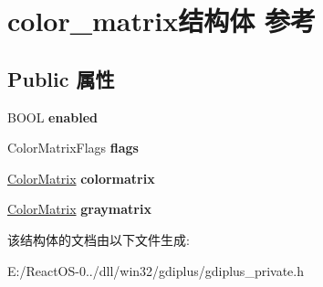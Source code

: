 \hypertarget{structcolor__matrix}{}\section{color\+\_\+matrix结构体 参考}
\label{structcolor__matrix}
\subsection*{Public 属性}
\begin{DoxyCompactItemize}
\item 
\mbox{\label{structcolor__matrix_a0e57d70052d91d05516f045275241356}} 
B\+O\+OL {\bfseries enabled}
\item 
\mbox{\label{structcolor__matrix_a3a161e561856f7972b680b5a2ded09dc}} 
Color\+Matrix\+Flags {\bfseries flags}
\item 
\mbox{\label{structcolor__matrix_aa2cf228e0829bccbf00be29ab5f65099}} 
\hyperlink{struct_color_matrix}{Color\+Matrix} {\bfseries colormatrix}
\item 
\mbox{\label{structcolor__matrix_a23803805270c61edfb04ccb86f2c7ffa}} 
\hyperlink{struct_color_matrix}{Color\+Matrix} {\bfseries graymatrix}
\end{DoxyCompactItemize}


该结构体的文档由以下文件生成\+:\begin{DoxyCompactItemize}
\item 
E\+:/\+React\+O\+S-\/0../dll/win32/gdiplus/gdiplus\+\_\+private.\+h\end{DoxyCompactItemize}
